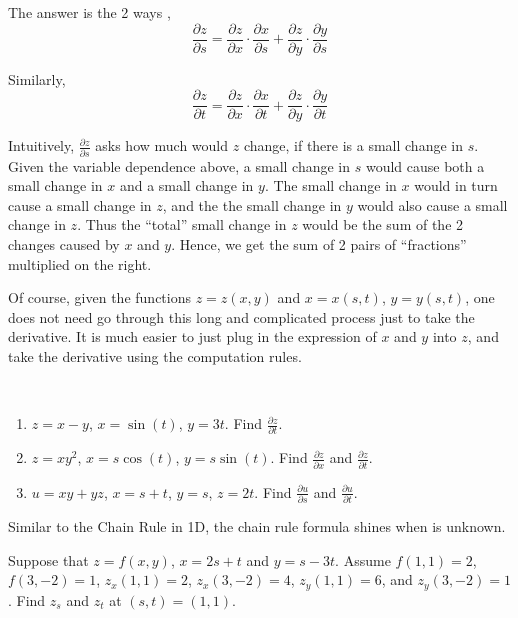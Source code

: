\documentclass[11pt,fleqn]{book} %
\begin{document}
The answer is the 2 ways , $$\frac{\partial z}{\partial s} = \frac{\partial z}{\partial x} \cdot \frac{\partial x}{\partial s} + \frac{\partial z}{\partial y} \cdot \frac{\partial y}{\partial s}$$

Similarly, $$\frac{\partial z}{\partial t} = \frac{\partial z}{\partial x} \cdot \frac{\partial x}{\partial t} + \frac{\partial z}{\partial y} \cdot \frac{\partial y}{\partial t}$$

Intuitively, $\frac{\partial z}{\partial s}$ asks how much would $z$ change, if there is a small change in $s$. Given the variable dependence above, a small change in $s$ would cause both a small change in $x$ and a small change in $y$. The small change in $x$ would in turn cause a small change in $z$, and the the small change in $y$ would also cause a small change in $z$. Thus the ``total'' small change in $z$ would be the sum of the 2 changes caused by $x$ and $y$. Hence, we get the sum of 2 pairs of ``fractions'' multiplied on the right.

Of course, given the functions $z = z(x, y)$ and $x = x(s, t)$, $y = y(s, t)$, one does not need go through this long and complicated process just to take the derivative. It is much easier to just plug in the expression of $x$ and $y$ into $z$, and take the derivative using the computation rules.

\begin{exercise}
$\text{ }$

    \begin{enumerate}
        \item $z = x - y$, $x = \sin(t)$, $y = 3t$. Find $\frac{\partial z}{\partial t}$.
        \item $z = xy^2$, $x = s\cos(t)$, $y = s\sin(t)$. Find $\frac{\partial z}{\partial x}$ and $\frac{\partial z}{\partial t}$.
        \item $u = xy + yz$, $x = s + t$, $y = s$, $z = 2t$. Find $\frac{\partial u}{\partial s}$ and $\frac{\partial u}{\partial t}$.
    \end{enumerate}
\end{exercise}

Similar to the Chain Rule in 1D, the chain rule formula shines when  is unknown.

\begin{exercise}
    Suppose that $z = f(x, y)$, $x = 2s + t$ and $y = s - 3t$. Assume $f(1,1) = 2$, $f(3,-2) = 1$, $z_x(1,1) = 2$, $z_x(3,-2) = 4$, $z_y(1,1) = 6$, and $z_y(3,-2) = 1$. Find $z_s$ and $z_t$ at $(s,t) = (1,1)$.
\end{exercise}
\end{document}
